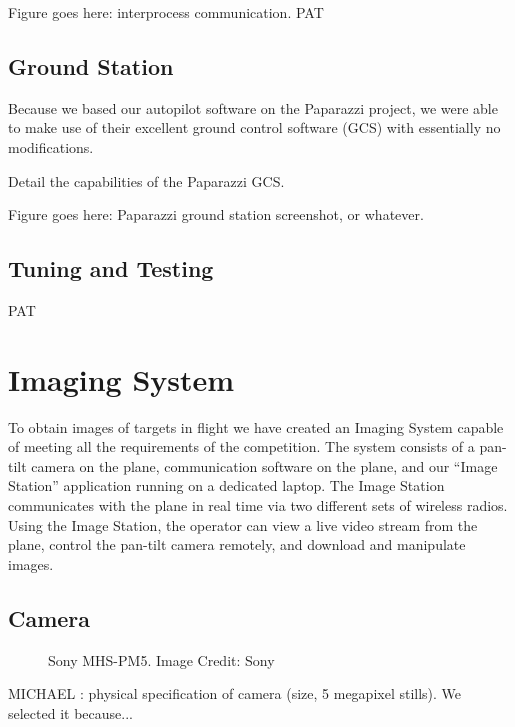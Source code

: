 \documentclass[10pt]{report}
\begin{document}
Figure goes here: interprocess communication. PAT
\subsection{Ground Station}
Because we based our autopilot software on the Paparazzi project, we were able to make use of their excellent ground control software (GCS) with essentially no modifications.

Detail the capabilities of the Paparazzi GCS.

Figure goes here: Paparazzi ground station screenshot, or whatever. 
\subsection{Tuning and Testing}
PAT

\section{Imaging System}

To obtain images of targets in flight we have created an Imaging System capable of meeting all the requirements of the competition.  The system consists of a pan-tilt camera on the plane, communication software on the plane, and our ``Image Station'' application running on a dedicated laptop.  The Image Station communicates with the plane in real time via two different sets of wireless radios.  Using the Image Station, the operator can view a live video stream from the plane, control the pan-tilt camera remotely, and download and manipulate images.

\subsection{Camera}
\begin{figure}
	\centering
	\caption{Sony MHS-PM5. Image Credit: Sony}
	\label{fig:camera}
\end{figure}
MICHAEL : physical specification of camera (size, 5 megapixel stills). We selected it because...
\end{document}
